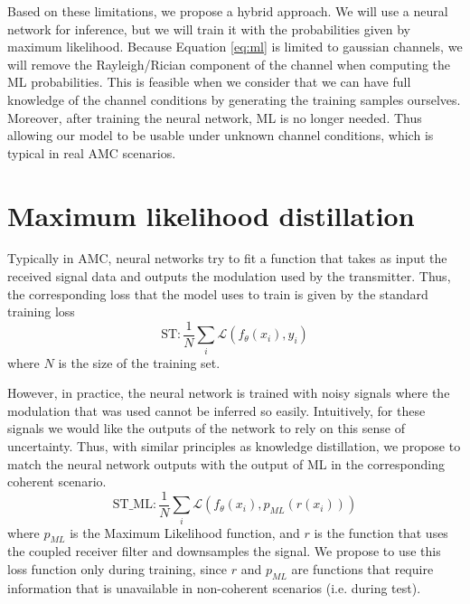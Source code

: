 \documentclass[conference]{IEEEtran}
\newcommand{\Ls}{\mathcal{L}}
\begin{document}
Based on these limitations, we propose a hybrid approach. We will use a neural network for inference, but we will train it with the probabilities given by maximum likelihood. Because Equation \ref{eq:ml} is limited to gaussian channels, we will remove the Rayleigh/Rician component of the channel when computing the ML probabilities. This is feasible when we consider that we can have full knowledge of the channel conditions by generating the training samples ourselves. Moreover, after training the neural network, ML is no longer needed. Thus allowing our model to be usable under unknown channel conditions, which is typical in real AMC scenarios.


\section{Maximum likelihood distillation}

Typically in AMC, neural networks try to fit a function that takes as input the received signal data and outputs the modulation used by the transmitter. Thus, the corresponding loss that the model uses to train is given by the standard training loss
\begin{equation}
    \text{ST} : \dfrac{1}{N}\sum_{i}\Ls(f_{\theta}(x_i), y_i)
\end{equation}
where $N$ is the size of the training set.

However, in practice, the neural network is trained with noisy signals where the modulation that was used cannot be inferred so easily. Intuitively, for these signals we would like the outputs of the network to rely on this sense of uncertainty. Thus, with similar principles as knowledge distillation, we propose to match the neural network outputs with the output of ML in the corresponding coherent scenario.
\begin{equation}
    \text{ST\_ML} : \dfrac{1}{N}\sum_{i}\Ls(f_{\theta}(x_i), p_{ML}(r(x_i)))
\label{eq:st_ml}
\end{equation}
where $p_{ML}$ is the Maximum Likelihood function, and $r$ is the function that uses the coupled receiver filter and downsamples the signal. We propose to use this loss function only during training, since $r$ and $p_{ML}$ are functions that require information that is unavailable in non-coherent scenarios (i.e. during test).
\end{document}
